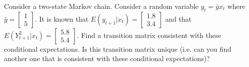 \documentclass{homework}
\begin{document}
\begin{homeworkProblem}[Problem 2.2]

  Consider a two-state Markov chain. Consider a random variable $y_t = \bar{y} x_t$ where $\bar{y} = \left[\begin{smallmatrix} 1 \\ 5 \end{smallmatrix}\right]$. It is known that $E(y_{t+1} | x_t) = \left[\begin{smallmatrix} 1.8 \\ 3.4 \end{smallmatrix}\right]$ and that $E(Y^2_{t+1} |x_t) = \left[\begin{smallmatrix} 5.8 \\ 5.4 \end{smallmatrix}\right]$. Find a transition matrix consistent with these conditional expectations. Is this transition matrix unique (i.e. can you find another one that is consistent with these conditional expectations)?

  \vspace{.2in}

\end{homeworkProblem}
\end{document}
